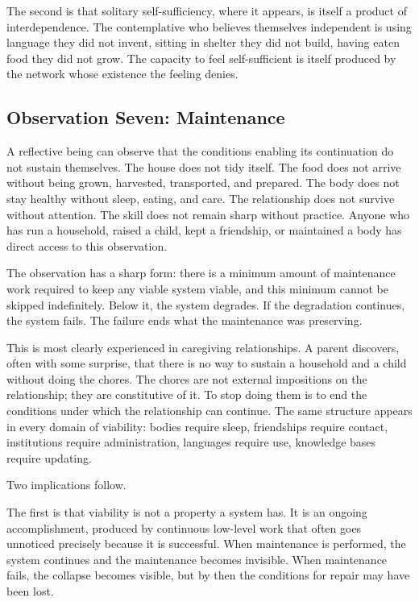 \documentclass[11pt]{article}
\begin{document}
The second is that solitary self-sufficiency, where it appears, is
itself a product of interdependence. The contemplative who believes
themselves independent is using language they did not invent,
sitting in shelter they did not build, having eaten food they did
not grow. The capacity to feel self-sufficient is itself produced
by the network whose existence the feeling denies.

\subsection{Observation Seven: Maintenance}

A reflective being can observe that the conditions enabling its
continuation do not sustain themselves. The house does not tidy
itself. The food does not arrive without being grown, harvested,
transported, and prepared. The body does not stay healthy without
sleep, eating, and care. The relationship does not survive without
attention. The skill does not remain sharp without practice.
Anyone who has run a household, raised a child, kept a friendship,
or maintained a body has direct access to this observation.

The observation has a sharp form: there is a minimum amount of
maintenance work required to keep any viable system viable, and
this minimum cannot be skipped indefinitely. Below it, the system
degrades. If the degradation continues, the system fails. The
failure ends what the maintenance was preserving.

This is most clearly experienced in caregiving relationships. A
parent discovers, often with some surprise, that there is no way
to sustain a household and a child without doing the chores. The
chores are not external impositions on the relationship; they are
constitutive of it. To stop doing them is to end the conditions
under which the relationship can continue. The same structure
appears in every domain of viability: bodies require sleep,
friendships require contact, institutions require administration,
languages require use, knowledge bases require updating.

Two implications follow.

The first is that viability is not a property a system has. It is
an ongoing accomplishment, produced by continuous low-level work
that often goes unnoticed precisely because it is successful. When
maintenance is performed, the system continues and the maintenance
becomes invisible. When maintenance fails, the collapse becomes
visible, but by then the conditions for repair may have been lost.
\end{document}
